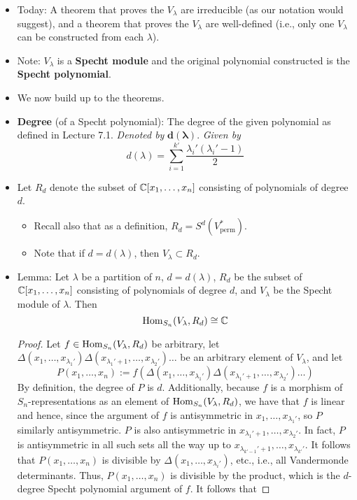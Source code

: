 \documentclass[../notes.tex]{subfiles}
\begin{document}
\begin{itemize}
    \item Today: A theorem that proves the $V_\lambda$ are irreducible (as our notation would suggest), and a theorem that proves the $V_\lambda$ are well-defined (i.e., only one $V_\lambda$ can be constructed from each $\lambda$).
    \item Note: $V_\lambda$ is a \textbf{Specht module} and the original polynomial constructed is the \textbf{Specht polynomial}.
    \item We now build up to the theorems.
    \item \textbf{Degree} (of a Specht polynomial): The degree of the given polynomial as defined in Lecture 7.1. \emph{Denoted by} $\bm{d(\lambda)}$. \emph{Given by}
    \begin{equation*}
        d(\lambda) = \sum_{i=1}^{k'}\frac{\lambda_i'(\lambda_i'-1)}{2}
    \end{equation*}
    \item Let $R_d$ denote the subset of $\mathbb{C}[x_1,\dots,x_n]$ consisting of polynomials of degree $d$.
    \begin{itemize}
        \item Recall also that as a definition, $R_d=S^d(V_\text{perm}^*)$.
        \item Note that if $d=d(\lambda)$, then $V_\lambda\subset R_d$.
    \end{itemize}
    \item Lemma: Let $\lambda$ be a partition of $n$, $d=d(\lambda)$, $R_d$ be the subset of $\mathbb{C}[x_1,\dots,x_n]$ consisting of polynomials of degree $d$, and $V_\lambda$ be the Specht module of $\lambda$. Then
    \begin{equation*}
        \operatorname{Hom}_{S_n}(V_\lambda,R_d) \cong \mathbb{C}
    \end{equation*}
    \begin{proof}
        Let $f\in\operatorname{Hom}_{S_n}(V_\lambda,R_d)$ be arbitrary, let $\Delta(x_1,\dots,x_{\lambda_1'})\Delta(x_{\lambda_1'+1},\dots,x_{\lambda_2'})\dots$ be an arbitrary element of $V_\lambda$, and let
        \begin{equation*}
            P(x_1,\dots,x_n) := f(\Delta(x_1,\dots,x_{\lambda_1'})\Delta(x_{\lambda_1'+1},\dots,x_{\lambda_2'})\dots)
        \end{equation*}
        By definition, the degree of $P$ is $d$. Additionally, because $f$ is a morphism of $S_n$-representations as an element of $\operatorname{Hom}_{S_n}(V_\lambda,R_d)$, we have that $f$ is linear and hence, since the argument of $f$ is antisymmetric in $x_1,\dots,x_{\lambda_1'}$, so $P$ similarly antisymmetric. $P$ is also antisymmetric in $x_{\lambda_1'+1},\dots,x_{\lambda_2'}$. In fact, $P$ is antisymmetric in all such sets all the way up to $x_{\lambda_{k'-1}'+1},\dots,x_{\lambda_{k'}'}$. It follows that $P(x_1,\dots,x_n)$ is divisible by $\Delta(x_1,\dots,x_{\lambda_i'})$, etc., i.e., all Vandermonde determinants. Thus, $P(x_1,\dots,x_n)$ is divisible by the product, which is the $d$-degree Specht polynomial argument of $f$. It follows that

\end{proof}
\end{itemize}
\end{document}
